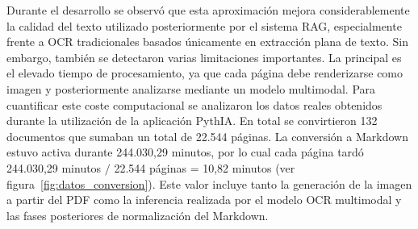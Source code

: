 Durante el desarrollo se observó que esta aproximación mejora considerablemente la calidad del texto utilizado posteriormente por el sistema RAG, especialmente frente a OCR tradicionales basados únicamente en extracción plana de texto. Sin embargo, también se detectaron varias limitaciones importantes. La principal es el elevado tiempo de procesamiento, ya que cada página debe renderizarse como imagen y posteriormente analizarse mediante un modelo multimodal. Para cuantificar este coste computacional se analizaron los datos reales obtenidos durante la utilización de la aplicación PythIA. En total se convirtieron 132 documentos que sumaban un total de 22.544 páginas. La conversión a Markdown estuvo activa durante 244.030,29 minutos, por lo cual cada página tardó 244.030,29 minutos $/$ 22.544 páginas = 10,82 minutos (ver figura~\ref{fig:datos_conversion}). Este valor incluye tanto la generación de la imagen a partir del PDF como la inferencia realizada por el modelo OCR multimodal y las fases posteriores de normalización del Markdown.

